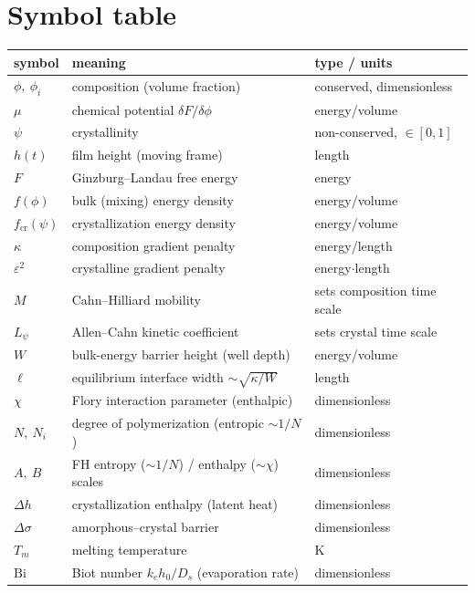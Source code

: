 \section{Symbol table}

\begin{center}\small
\begin{tabular}{lll}
\toprule
symbol & meaning & type / units \\
\midrule
$\phi,\ \phi_i$ & composition (volume fraction) & conserved, dimensionless \\
$\mu$           & chemical potential $\delta F/\delta\phi$ & energy/volume \\
$\psi$          & crystallinity & non-conserved, $\in[0,1]$ \\
$h(t)$          & film height (moving frame) & length \\
$F$             & Ginzburg--Landau free energy & energy \\
$f(\phi)$       & bulk (mixing) energy density & energy/volume \\
$f_{\text{cr}}(\psi)$ & crystallization energy density & energy/volume \\
$\kappa$        & composition gradient penalty & energy/length \\
$\varepsilon^2$ & crystalline gradient penalty & energy$\cdot$length \\
$M$             & Cahn--Hilliard mobility & sets composition time scale \\
$L_\psi$        & Allen--Cahn kinetic coefficient & sets crystal time scale \\
$W$             & bulk-energy barrier height (well depth) & energy/volume \\
$\ell$          & equilibrium interface width $\sim\!\sqrt{\kappa/W}$ & length \\
$\chi$          & Flory interaction parameter (enthalpic) & dimensionless \\
$N,\ N_i$       & degree of polymerization (entropic $\sim1/N$) & dimensionless \\
$A,\ B$         & FH entropy ($\sim1/N$) / enthalpy ($\sim\chi$) scales & dimensionless \\
$\Delta h$      & crystallization enthalpy (latent heat) & dimensionless \\
$\Delta\sigma$  & amorphous--crystal barrier & dimensionless \\
$T_m$           & melting temperature & K \\
$\mathrm{Bi}$   & Biot number $k_e h_0/D_s$ (evaporation rate) & dimensionless \\

\end{tabular}
\end{center}
